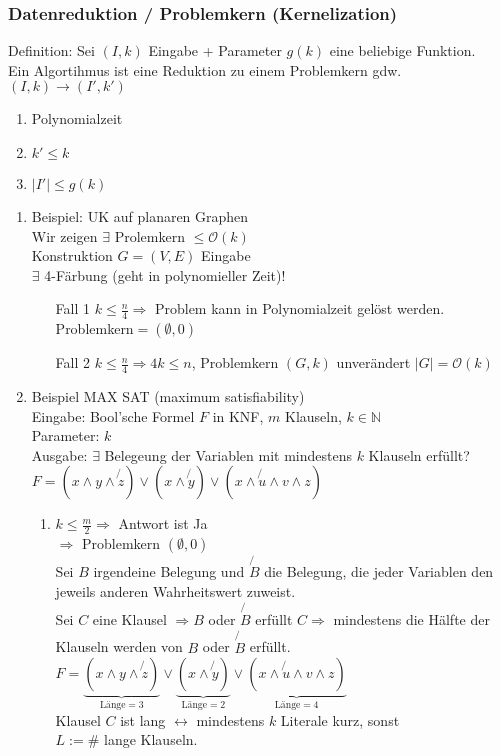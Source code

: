 \subsubsection{Datenreduktion / Problemkern (Kernelization)}
Definition: Sei $(I,k)$ Eingabe + Parameter $g(k)$ eine beliebige Funktion.\\
Ein Algortihmus ist eine Reduktion zu einem Problemkern gdw. $(I,k) \rightarrow (I',k')$\\
\begin{enumerate}
\item Polynomialzeit
\item $k' \leq k$
\item $|I'| \leq g(k)$
\end{enumerate}
\begin{enumerate}
\item Beispiel: UK auf planaren Graphen\\
Wir zeigen $\exists$ Prolemkern $\leq \mathcal{O}(k)$\\
Konstruktion $G=(V,E)$ Eingabe\\
$\exists$ 4-Färbung (geht in polynomieller Zeit)!
\begin{enumerate}
\item[Fall 1] $k\leq \frac{n}{4} \Rightarrow$ Problem kann in Polynomialzeit gelöst werden. Problemkern$= (\emptyset,0)$\\
\item[Fall 2] $k \leq \frac{n}{4} \Rightarrow 4k \leq n$, Problemkern $(G,k)$ unverändert $|G| = \mathcal{O}(k)$\\
\end{enumerate}
\item Beispiel MAX SAT (maximum satisfiability)\\
Eingabe: Bool'sche Formel $F$ in KNF, $m$ Klauseln, $k \in \mathbb{N}$\\
Parameter: $k$\\
Ausgabe: $\exists$ Belegeung der Variablen mit mindestens $k$ Klauseln erfüllt?\\
$F = (x \land y \land \not{z}) \lor (x \land \not{y}) \lor (x \land \not{u} \land v \land z)$\\
\begin{enumerate}
\item $k \leq \frac{m}{2} \Rightarrow$ Antwort ist Ja\\
$\Rightarrow$ Problemkern $(\emptyset, 0)$\\
Sei $B$ irgendeine Belegung und $\not{B}$ die Belegung, die jeder Variablen den jeweils anderen Wahrheitswert zuweist.\\
Sei $C$ eine Klausel $\Rightarrow B$ oder $\not{B}$ erfüllt $C \Rightarrow$ mindestens die Hälfte der Klauseln werden von $B$ oder $\not{B}$ erfüllt.\\ 
$F = \underbrace{(x \land y \land \not{z})}_{\text{Länge}=3} \lor  \underbrace{(x \land \not{y})}_{\text{Länge}=2} \lor \underbrace{(x \land \not{u} \land v \land z)}_{\text{Länge}=4}$\\
Klausel $C$ ist lang $\leftrightarrow$ mindestens $k$ Literale kurz, sonst\\
$L:=\#$ lange Klauseln.
\end{enumerate}

\end{enumerate}
